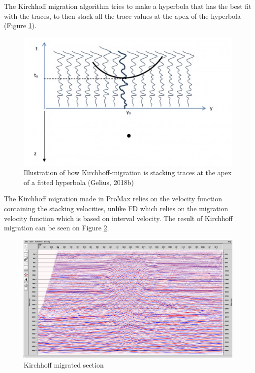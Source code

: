 \documentclass[10pt,a4paper]{article}
\begin{document}
The Kirchhoff migration algorithm tries to make a hyperbola that has the best fit with the traces, to then stack all the trace values at the apex of the hyperbola (Figure \ref{KGeoClass}). 

\begin{figure}[H]
\centering
\includegraphics[scale=0.5]{kirchhoffGeoClass.jpg}
\caption{Illustration of how Kirchhoff-migration is stacking traces at the apex of a fitted hyperbola (Gelius, 2018b)}
\label{KGeoClass}
\end{figure}

\noindent The Kirchhoff migration made in ProMax relies on the velocity function containing the stacking velocities, unlike FD which relies on the migration velocity function which is based on interval velocity. The result of Kirchhoff migration can be seen on Figure \ref{KTM}.

\begin{figure}[H]
\includegraphics[width=\textwidth]{kirchhmed3aforkirchh.jpg}
\caption{Kirchhoff migrated section}
\label{KTM}
\end{figure}
\end{document}
